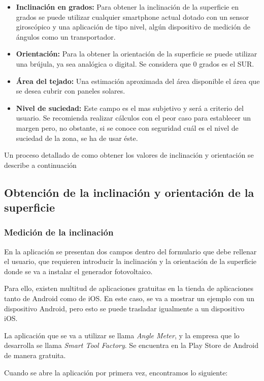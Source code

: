 \begin{itemize}
\item \textbf{Inclinación en grados:} Para obtener la inclinación de la superficie en grados se puede utilizar cualquier smartphone actual dotado con un sensor giroscópico y una aplicación de tipo nivel, algún dispositivo de medición de ángulos como un transportador.
\item \textbf{Orientación:} Para la obtener la orientación de la superficie se puede utilizar una brújula, ya sea analógica o digital. Se considera que 0 grados es el SUR.
\item \textbf{Área del tejado:} Una estimación aproximada del área disponible el área que se desea cubrir con paneles solares.
\item \textbf{Nivel de suciedad:} Este campo es el mas subjetivo y será a criterio del usuario. Se recomienda realizar cálculos con el peor caso para establecer un margen pero, no obstante, si se conoce con seguridad cuál es el nivel de suciedad de la zona, se ha de usar éste.
\end{itemize}

Un proceso detallado de como obtener los valores de inclinación y orientación se describe a continuación

\subsection{Obtención de la inclinación y orientación de la superficie}

\subsubsection{Medición de la inclinación}

En la aplicación se presentan dos campos dentro del formulario que debe rellenar el usuario, que requieren introducir la inclinación y la orientación de la superficie donde se va a instalar el generador fotovoltaico.

Para ello, existen multitud de aplicaciones gratuitas en la tienda de aplicaciones tanto de Android como de iOS. En este caso, se va a mostrar un ejemplo con un dispositivo Android, pero esto se puede trasladar igualmente a un dispositivo iOS.

La aplicación que se va a utilizar se llama \textit{Angle Meter}, y la empresa que lo desarrolla se llama \textit{Smart Tool Factory}. Se encuentra en la Play Store de Android de manera gratuita.

Cuando se abre la aplicación por primera vez, encontramos lo siguiente:


